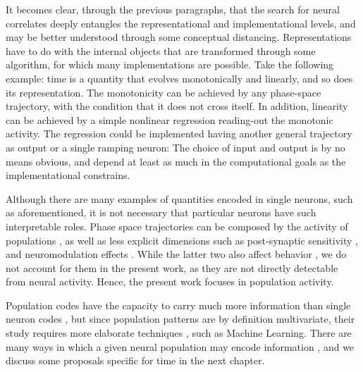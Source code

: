 
    It becomes clear, through the previous paragraphs, that the search for neural correlates deeply entangles the representational and implementational levels, and may be better understood through some conceptual distancing. Representations have to do with the internal objects that are transformed through some algorithm, for which many implementations are possible. Take the following example: time is a quantity that evolves monotonically and linearly, and so does its representation. The monotonicity can be achieved by any phase-space trajectory, with the condition that it does not cross itself. In addition, linearity can be achieved by a simple nonlinear regression reading-out the monotonic activity. The regression could be implemented having another general trajectory as output \cite{gallant1975nonlinear} or a single ramping neuron: The choice of input and output is by no means obvious, and depend at least as much in the computational goals as the implementational constrains.
    
    Although there are many examples of quantities encoded in single neurons, such as aforementioned, it is not necessary that particular neurons have such interpretable roles. Phase space trajectories can be composed by the activity of populations \cite{shamir2014emerging, quiroga2009extracting}, as well as less explicit dimensions such as post-synaptic sensitivity \cite{motanis2018short}, and neuromodulation effects \cite{friston2009free, friston2010free}. While the latter two also affect behavior \cite{wolff2017dynamic}, we do not account for them in the present work, as they are not directly detectable from neural activity. Hence, the present work focuses in population activity.
    
    Population codes have the capacity to carry much more information than single neuron codes \cite{hardy2016neurocomputational}, but since population patterns are by definition multivariate, their study requires more elaborate techniques \cite{quiroga2009extracting}, such as Machine Learning. 
    There are many ways in which a given neural population may encode information \cite{quiroga2009extracting, shamir2014emerging, mello2015scalable}, and we discuss some proposals specific for time in the next chapter.